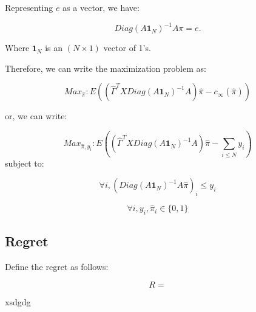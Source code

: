 \documentclass[12pt,a4paper]{article}
\begin{document}
Representing $e$ as a vector, we have: 

$$Diag(A \mathbf{1}_{N} ) ^{-1} A\pi  = e.$$

Where $\mathbf{1}_{N}$ is an $(N \times 1)$ vector of 1's.

Therefore, we can write the maximization problem as:

$$Max_{\hat \pi}: E \left( \left(\hat \Gamma^T X Diag(A \mathbf{1}_{N} ) ^{-1} A \right) \hat \pi  -  c_\infty(\hat \pi) \right)$$

or, we can write:

$$Max_{\hat \pi, y_i}: E \left( \left(\hat \Gamma^T X Diag(A \mathbf{1}_{N} ) ^{-1} A \right) \hat \pi  - \sum_{i \leq N} y_i \right)$$ subject to: 

$$\forall i,  \left( Diag(A \mathbf{1}_{N} ) ^{-1} A \hat \pi \right)_i \leq y_i$$

$$\forall i, y_i, \hat \pi_i \in \{0,1\} $$

\subsection{Regret}
Define the regret as follows:

$$R =  $$

\begin{theorem}
xsdgdg
\end{theorem}
\end{document}
